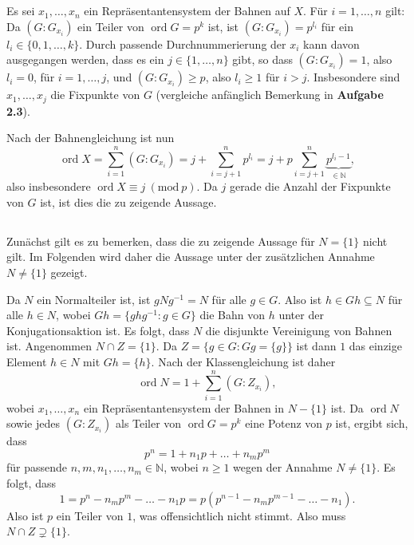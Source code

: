 \documentclass[a4paper,10pt]{article}
\theoremstyle{definition}
\newcommand{\N}{\mathbb{N}}
\newcommand{\ord}{\operatorname{ord}}
\begin{document}
\section{}

\subsection{}
Es sei $x_1, \ldots, x_n$ ein Repräsentantensystem der Bahnen auf $X$. Für $i=1,\ldots,n$ gilt: Da $(G : G_{x_i})$ ein Teiler von $\ord G = p^k$ ist, ist $(G : G_{x_i}) = p^{l_i}$ für ein $l_i \in \{0, 1, \ldots, k\}$. Durch passende Durchnummerierung der $x_i$ kann davon ausgegangen werden, dass es ein $j \in \{1,\ldots,n\}$ gibt, so dass $(G : G_{x_i}) = 1$, also $l_i = 0$, für $i=1,\ldots,j$, und $(G : G_{x_i}) \geq p$, also $l_i \geq 1$ für $i > j$. Insbesondere sind $x_1, \ldots, x_j$ die Fixpunkte von $G$ (vergleiche anfänglich Bemerkung in \textbf{Aufgabe 2.3}).

Nach der Bahnengleichung ist nun
\[
 \ord X
 = \sum_{i=1}^n (G : G_{x_i})
 = j + \sum_{i=j+1}^n p^{l_i}
 = j + p \sum_{i=j+1}^n \underbrace{p^{l_i - 1}}_{\in \N},
\]
also insbesondere $\ord X \equiv j\ (\textrm{mod}\ p)$. Da $j$ gerade die Anzahl der Fixpunkte von $G$ ist, ist dies die zu zeigende Aussage.


\subsection{}
Zunächst gilt es zu bemerken, dass die zu zeigende Aussage für $N = \{1\}$ nicht gilt. Im Folgenden wird daher die Aussage unter der zusätzlichen Annahme $N \neq \{1\}$ gezeigt.

Da $N$ ein Normalteiler ist, ist $gNg^{-1} = N$ für alle $g \in G$. Also ist $h \in Gh \subseteq N$ für alle $h \in N$, wobei $Gh = \{ghg^{-1} : g \in G\}$ die Bahn von $h$ unter der Konjugationsaktion ist. Es folgt, dass $N$ die disjunkte Vereinigung von Bahnen ist. Angenommen $N \cap Z = \{1\}$. Da $Z = \{g \in G : Gg = \{g\}\}$ ist dann $1$ das einzige Element $h \in N$ mit $Gh = \{h\}$. Nach der Klassengleichung ist daher
\[
 \ord N = 1 + \sum_{i=1}^n (G : Z_{x_i}),
\]
wobei $x_1, \ldots, x_n$ ein Repräsentantensystem der Bahnen in $N-\{1\}$ ist. Da $\ord N$ sowie jedes $(G : Z_{x_i})$ als Teiler von $\ord G = p^k$ eine Potenz von $p$ ist, ergibt sich, dass
\[
 p^n = 1 + n_1 p + \ldots + n_m p^m
\]
für passende $n,m, n_1, \ldots, n_m \in \N$, wobei $n \geq 1$ wegen der Annahme $N \neq \{1\}$. Es folgt, dass
\[
 1 = p^n - n_m p^m - \ldots - n_1 p = p ( p^{n-1} - n_m p^{m-1} - \ldots - n_1 ).
\]
Also ist $p$ ein Teiler von $1$, was offensichtlich nicht stimmt. Also muss $N \cap Z \supsetneq \{1\}$.
\end{document}

